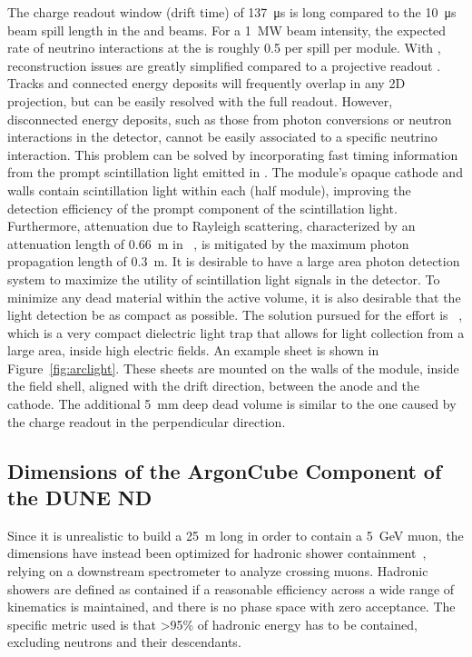 The charge readout window (drift time) of \SI{137}{\micro\second} is long compared to the \SI{10}{\micro\second}~\cite{Adamson:2015dkw} beam spill length in the  and  beams.
For a \SI{1}{MW} beam intensity, the expected rate of neutrino interactions at the   is roughly 0.5 per spill per  module.  
With , reconstruction issues are greatly simplified compared to a projective readout .
Tracks and connected energy deposits will frequently overlap in any 2D projection, but can be easily resolved with the full \threed readout.
However, disconnected energy deposits, such as those from photon conversions or neutron interactions in the detector, cannot be easily associated to a specific neutrino interaction.
This problem can be solved by incorporating fast timing information from the prompt scintillation light emitted in .
The module's opaque cathode and walls contain scintillation light within each  (half module), improving the detection efficiency of the prompt component of the scintillation light. 
Furthermore, attenuation due to Rayleigh scattering, characterized by an attenuation length of \SI{0.66}{\metre} in ~\cite{Grace:2015yta}, is mitigated by the maximum photon propagation length of \SI{0.3}{\metre}. 
It is desirable to have a large area photon detection system to maximize the utility of scintillation light signals in the detector. 
To minimize any dead material within the active volume, it is also desirable that the light detection be as compact as possible. 
The solution pursued for the  effort is ~\cite{Auger:2017flc}, which is a very compact dielectric light trap that allows for light collection from a large area, inside high electric fields. 
An example  sheet is shown in Figure~\ref{fig:arclight}. These sheets are mounted on the walls of the module, inside the field shell, aligned with the drift direction, between the anode and the cathode. 
The additional \SI{5}{\milli\metre} deep dead volume is similar to the one caused by the charge readout in the perpendicular direction.

\subsection{Dimensions of the ArgonCube Component of the DUNE  ND}\label{sec:had_containment}

Since it is unrealistic to build a \SI{25}{\metre} long  in order to contain a \SI{5}{\giga\electronvolt} muon, the  dimensions have instead been optimized for hadronic shower containment~\cite{lartpcSizeChris}, relying on a downstream spectrometer to analyze crossing muons.
Hadronic showers are defined as contained if a reasonable efficiency across a wide range of kinematics is maintained, and there is no phase space with zero acceptance. 
The specific metric used is that \textgreater95\% of hadronic energy has to be contained, excluding neutrons and their descendants.

